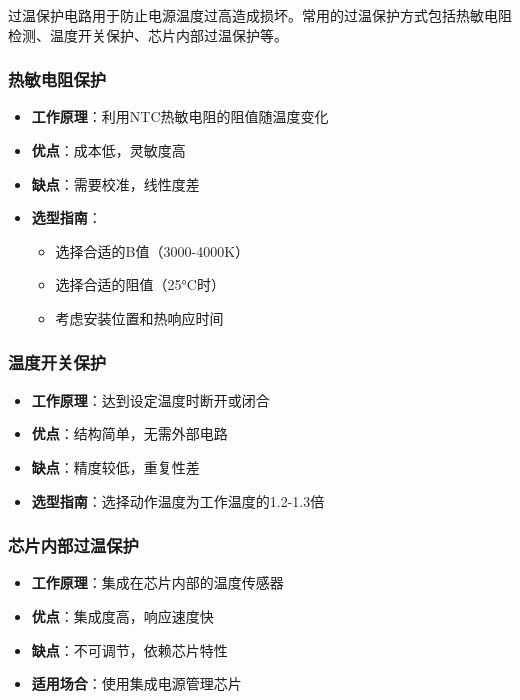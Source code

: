\documentclass[12pt,UTF8]{ctexbook}
\begin{document}
过温保护电路用于防止电源温度过高造成损坏。常用的过温保护方式包括热敏电阻检测、温度开关保护、芯片内部过温保护等。

\subsubsection{热敏电阻保护}
\begin{itemize}
    \item \textbf{工作原理}：利用NTC热敏电阻的阻值随温度变化
    \item \textbf{优点}：成本低，灵敏度高
    \item \textbf{缺点}：需要校准，线性度差
    \item \textbf{选型指南}：
    \begin{itemize}
        \item 选择合适的B值（3000-4000K）
        \item 选择合适的阻值（25°C时）
        \item 考虑安装位置和热响应时间
    \end{itemize}
\end{itemize}

\subsubsection{温度开关保护}
\begin{itemize}
    \item \textbf{工作原理}：达到设定温度时断开或闭合
    \item \textbf{优点}：结构简单，无需外部电路
    \item \textbf{缺点}：精度较低，重复性差
    \item \textbf{选型指南}：选择动作温度为工作温度的1.2-1.3倍
\end{itemize}

\subsubsection{芯片内部过温保护}
\begin{itemize}
    \item \textbf{工作原理}：集成在芯片内部的温度传感器
    \item \textbf{优点}：集成度高，响应速度快
    \item \textbf{缺点}：不可调节，依赖芯片特性
    \item \textbf{适用场合}：使用集成电源管理芯片
\end{itemize}
\end{document}
